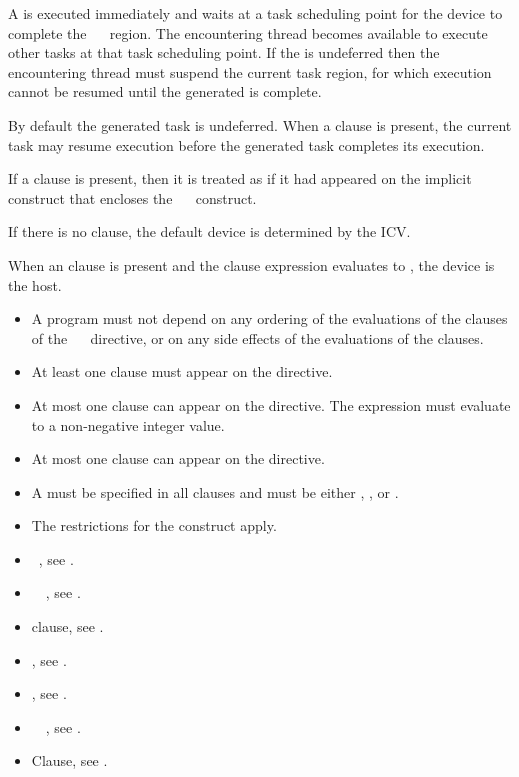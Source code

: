 A  is executed immediately and waits at a task scheduling point for the device to complete the ~~ region. The encountering thread becomes available to execute other tasks at that task scheduling point. If the  is undeferred then the encountering thread must suspend the current task region, for which execution cannot be resumed until the generated  is complete.

By default the generated task is undeferred. When a  clause is present, the current task may resume execution before the generated task completes its execution.

If a  clause is present, then it is treated as if it had appeared on the implicit  construct that encloses the ~~ construct.

If there is no  clause, the default device is determined by the  ICV.

When an  clause is present and the  clause expression evaluates to , the device is the host. 
\restrictions
\begin{itemize}
\item A program must not depend on any ordering of the evaluations of the clauses of the ~~ directive, or on any side effects of the evaluations of the clauses.
\item At least one  clause must appear on the directive.
\item At most one  clause can appear on the directive. The  expression must evaluate to a non-negative integer value.
\item At most one  clause can appear on the directive.
\item A  must be specified in all  clauses and must be either , , or .
\item The restrictions for the  construct apply. 
\end{itemize}

\crossreferences
\begin{itemize}
\item {}~, see .
\item {}~~, see .
\item {} clause, see .
\item {}, see .
\item {}, see .
\item {}~~, see . 
\item {} Clause, see .
\end{itemize}





